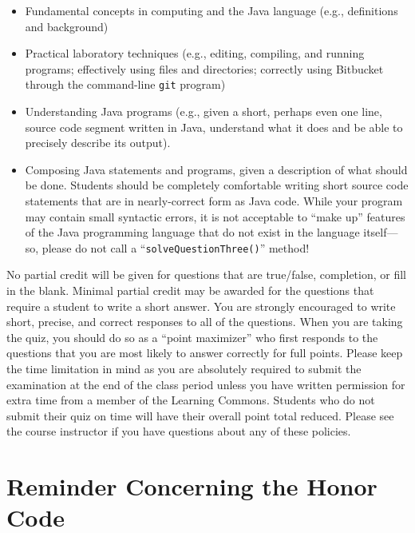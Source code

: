 \vspace*{-.05in}
\begin{itemize}

  \itemsep 0in

\item Fundamental concepts in computing and the Java language (e.g., definitions and background)

\item Practical laboratory techniques (e.g., editing, compiling, and running programs; effectively using files and
  directories; correctly using Bitbucket through the command-line {\tt git} program)

\item Understanding Java programs (e.g., given a short, perhaps even one line, source code segment written in Java,
  understand what it does and be able to precisely describe its output).

\item Composing Java statements and programs, given a description of what should be done. Students should be completely
  comfortable writing short source code statements that are in nearly-correct form as Java code. While your program may
  contain small syntactic errors, it is not acceptable to ``make up'' features of the Java programming language that do
  not exist in the language itself---so, please do not call a ``{\tt solveQuestionThree()}'' method!

\end{itemize}

\noindent No partial credit will be given for questions that are true/false, completion, or fill in the blank. Minimal
partial credit may be awarded for the questions that require a student to write a short answer. You are strongly
encouraged to write short, precise, and correct responses to all of the questions. When you are taking the quiz, you
should do so as a ``point maximizer'' who first responds to the questions that you are most likely to answer correctly for
full points. Please keep the time limitation in mind as you are absolutely required to submit the examination at the end
of the class period unless you have written permission for extra time from a member of the Learning Commons. Students
who do not submit their quiz on time will have their overall point total reduced. Please see the course instructor if
you have questions about any of these policies.

\section*{Reminder Concerning the Honor Code}

